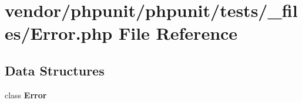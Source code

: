 \section{vendor/phpunit/phpunit/tests/\+\_\+files/\+Error.php File Reference}
\label{phpunit_2phpunit_2tests_2__files_2_error_8php}
\subsection*{Data Structures}
\begin{DoxyCompactItemize}
\item 
class {\bf Error}
\end{DoxyCompactItemize}
